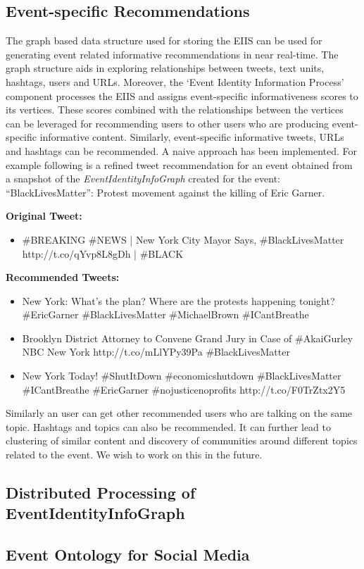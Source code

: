 \subsection{Event-specific Recommendations}
The graph based data structure used for storing the EIIS can be used for generating event related informative recommendations in near real-time. The graph structure aids in exploring relationships between tweets, text units, hashtags, users and URLs. Moreover, the `Event Identity Information Process' component processes the EIIS and assigns event-specific informativeness scores to its vertices. These scores combined with the relationships between the vertices can be leveraged for recommending users to other users who are producing event-specific informative content. Similarly, event-specific informative tweets, URLs and hashtags can be recommended. A naive approach has been implemented. For example following is a refined tweet recommendation for an event obtained from a snapshot of the \textit{EventIdentityInfoGraph} created for the event: “BlackLivesMatter”: Protest movement against the killing of Eric Garner.

\textbf{Original Tweet:}

\begin{itemize}
\item \#BREAKING \#NEWS | New York City Mayor Says, \#BlackLivesMatter \\ http://t.co/qYvp8L8gDh | \#BLACK  
\end{itemize}

\textbf{Recommended Tweets:}

\begin{itemize}

\item New York: What's the plan? Where are the protests happening tonight? \#EricGarner \#BlackLivesMatter \#MichaelBrown \#ICantBreathe

\item Brooklyn District Attorney to Convene Grand Jury in Case of \#AkaiGurley NBC New York http://t.co/mLlYPy39Pa \#BlackLivesMatter

\item New York Today! \#ShutItDown \#economicshutdown \#BlackLivesMatter \#ICantBreathe \#EricGarner \#nojusticenoprofits http://t.co/F0TrZtx2Y5

\end{itemize}

Similarly an user can get other recommended users who are talking on the same topic. Hashtags and topics can also be recommended. It can further lead to clustering of similar content and discovery of communities around different topics related to the event. We wish to work on this in the future.


\subsection{Distributed Processing of EventIdentityInfoGraph}

\subsection{Event Ontology for Social Media}